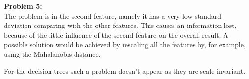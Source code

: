 \documentclass{article}
\begin{document}
\textbf{Problem 5:}\\

The problem is in the second feature, namely it has a very low standard deviation comparing with the other features. This causes an information lost, because of the little influence of the second feature on the overall result. A possible solution would be achieved by rescaling all the features by, for example, using the Mahalanobis distance.

For the decision trees such a problem doesn't appear as they are scale invariant.
\end{document}
